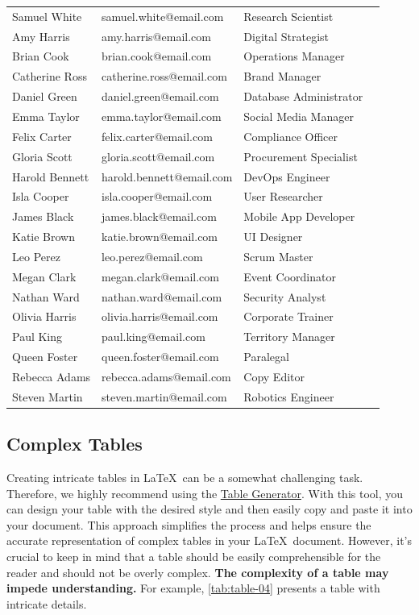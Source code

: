 \begin{longtable}[c]{llll}
Samuel White & samuel.white@email.com & Research Scientist \\ 
Amy Harris & amy.harris@email.com & Digital Strategist \\
Brian Cook & brian.cook@email.com & Operations Manager \\
Catherine Ross & catherine.ross@email.com & Brand Manager \\
Daniel Green & daniel.green@email.com & Database Administrator \\
Emma Taylor & emma.taylor@email.com & Social Media Manager \\
Felix Carter & felix.carter@email.com & Compliance Officer \\
Gloria Scott & gloria.scott@email.com & Procurement Specialist \\
Harold Bennett & harold.bennett@email.com & DevOps Engineer \\
Isla Cooper & isla.cooper@email.com & User Researcher \\
James Black & james.black@email.com & Mobile App Developer \\
Katie Brown & katie.brown@email.com & UI Designer \\
Leo Perez & leo.perez@email.com & Scrum Master \\
Megan Clark & megan.clark@email.com & Event Coordinator \\
Nathan Ward & nathan.ward@email.com & Security Analyst \\
Olivia Harris & olivia.harris@email.com & Corporate Trainer \\
Paul King & paul.king@email.com & Territory Manager \\
Queen Foster & queen.foster@email.com & Paralegal \\
Rebecca Adams & rebecca.adams@email.com & Copy Editor \\
Steven Martin & steven.martin@email.com & Robotics Engineer \\
\end{longtable}

\subsection{Complex Tables}
Creating intricate tables in \LaTeX\ can be a somewhat challenging task. Therefore, we highly recommend using the \href{https://www.tablesgenerator.com/}{Table Generator}. With this tool, you can design your table with the desired style and then easily copy and paste it into your document. This approach simplifies the process and helps ensure the accurate representation of complex tables in your \LaTeX\ document. However, it's crucial to keep in mind that a table should be easily comprehensible for the reader and should not be overly complex. \textbf{The complexity of a table may impede understanding.} For example, \autoref{tab:table-04} presents a table with intricate details.

